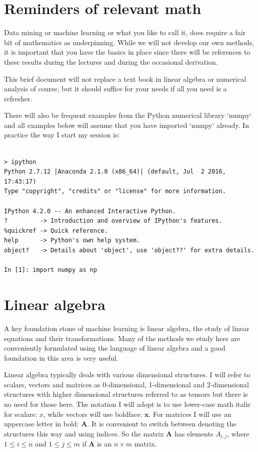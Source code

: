 \documentclass[a4paper,10pt]{article}
\begin{document}
 
 \section{ Reminders of relevant math}

Data mining or machine learning or what you like to call it, does require a fair bit of mathematics as underpinning. While we will not develop our own methods, it is important that you have the basics in place since there will be references to these results during the lectures and during the occasional derivation.

This brief document will not replace a text book in linear algebra or numerical analysis of course, but it should suffice for your needs if all you need is a refresher.

There will also be frequent examples from the Python numerical library `numpy` and all examples below will assume that you have imported `numpy` already. In practice the way I start my session is:
\begin{lstlisting}

> ipython
Python 2.7.12 |Anaconda 2.1.0 (x86_64)| (default, Jul  2 2016, 17:43:17) 
Type "copyright", "credits" or "license" for more information.

IPython 4.2.0 -- An enhanced Interactive Python.
?         -> Introduction and overview of IPython's features.
%quickref -> Quick reference.
help      -> Python's own help system.
object?   -> Details about 'object', use 'object??' for extra details.

In [1]: import numpy as np
\end{lstlisting}

\section{ Linear algebra}

A key foundation stone of machine learning is linear algebra, the study of linear equations and their transformations. Many of the methods we study here are conveniently formulated using the language of linear algebra and a good foundation in this area is very useful.

Linear algebra typically deals with various dimensional structures. I will refer to scalars, vectors and matrices as 0-dimensional, 1-dimensional and 2-dimensional structures with higher dimensional structures referred to as tensors but there is no need for those here. The notation I will adopt is to use lower-case math italic for scalars: $x$, while vectors will use boldface: $\mathbf{x}$. For matrices I will use an uppercase letter in bold: $\mathbf{A}$. It is convenient to switch between denoting the structures this way and using indices. So the matrix $\mathbf{A}$ has elements $A_{i, j}$, where $1\le i\le n$ and $1 \le j \le m$ if $\mathbf{A}$ is an $n\times m$ matrix. 
 
\end{document}
